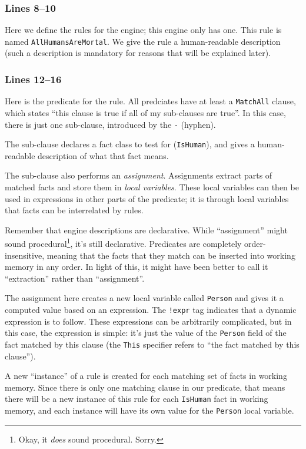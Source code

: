 \documentclass[letterpaper,10pt]{article}
\begin{document}
\subsubsection*{Lines 8--10}
Here we define the rules for the engine; this engine only has one.
This rule is named \texttt{AllHumansAreMortal}.
We give the rule a human-readable description (such a description is mandatory for reasons that will be explained later).

\subsubsection*{Lines 12--16}
Here is the predicate for the rule.
All predciates have at least a \texttt{MatchAll} clause, which states ``this clause is true if all of my sub-clauses are true''.
In this case, there is just one sub-clause, introduced by the \texttt{-} (hyphen).

The sub-clause declares a fact class to test for (\texttt{IsHuman}), and gives a human-readable description of what that fact means.

The sub-clause also performs an \emph{assignment}.
Assignments extract parts of matched facts and store them in \emph{local variables}.
These local variables can then be used in expressions in other parts of the predicate; it is through local variables that facts can be interrelated by rules.

Remember that engine descriptions are declarative.
While ``assignment'' might sound procedural\footnote{Okay, it \emph{does} sound procedural.
Sorry.}, it's still declarative.
Predicates are completely order-insensitive, meaning that the facts that they match can be inserted into working memory in any order.
In light of this, it might have been better to call it ``extraction'' rather than ``assignment''.

The assignment here creates a new local variable called \texttt{Person} and gives it a computed value based on an expression.
The \texttt{!expr} tag indicates that a dynamic expression is to follow.
These expressions can be arbitrarily complicated, but in this case, the expression is simple: it's just the value of the \texttt{Person} field of the fact matched by this clause (the \texttt{This} specifier refers to ``the fact matched by this clause'').

A new ``instance'' of a rule is created for each matching set of facts in working memory.
Since there is only one matching clause in our predicate, that means there will be a new instance of this rule for each \texttt{IsHuman} fact in working memory, and each instance will have its own value for the \texttt{Person} local variable.
\end{document}
